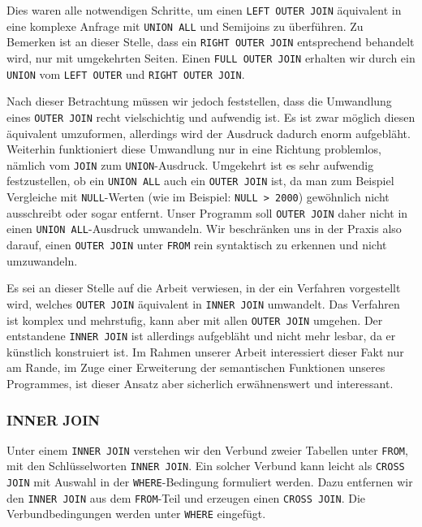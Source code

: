 Dies waren alle notwendigen Schritte, um einen \verb|LEFT OUTER JOIN| äquivalent in eine komplexe Anfrage mit \verb|UNION ALL| und Semijoins zu überführen. Zu Bemerken ist an dieser Stelle, dass ein \verb|RIGHT OUTER JOIN| entsprechend behandelt wird, nur mit umgekehrten Seiten. Einen \verb|FULL OUTER JOIN| erhalten wir durch ein \verb|UNION| vom \verb|LEFT OUTER| und \verb|RIGHT OUTER JOIN|. 

Nach dieser Betrachtung müssen wir jedoch feststellen, dass die Umwandlung eines \verb|OUTER JOIN| recht vielschichtig und aufwendig ist. Es ist zwar möglich diesen äquivalent umzuformen, allerdings wird der Ausdruck dadurch enorm aufgebläht. Weiterhin funktioniert diese Umwandlung nur in eine Richtung problemlos, nämlich vom \verb|JOIN| zum \verb|UNION|-Ausdruck. Umgekehrt ist es sehr aufwendig festzustellen, ob ein \verb|UNION ALL| auch ein \verb|OUTER JOIN| ist, da man zum Beispiel Vergleiche mit \verb|NULL|-Werten (wie im Beispiel: \verb|NULL > 2000|) gewöhnlich nicht ausschreibt oder sogar entfernt. Unser Programm soll \verb|OUTER JOIN| daher nicht in einen \verb|UNION ALL|-Ausdruck umwandeln. Wir beschränken uns in der Praxis also darauf, einen \verb|OUTER JOIN| unter \verb|FROM| rein syntaktisch zu erkennen und nicht umzuwandeln. 

Es sei an dieser Stelle auf die Arbeit \cite{outer2inner} verwiesen, in der ein Verfahren vorgestellt wird, welches \verb|OUTER JOIN| äquivalent in \verb|INNER JOIN| umwandelt. Das Verfahren ist komplex und mehrstufig, kann aber mit allen \verb|OUTER JOIN| umgehen. Der entstandene \verb|INNER JOIN| ist allerdings aufgebläht und nicht mehr lesbar, da er künstlich konstruiert ist. Im Rahmen unserer Arbeit interessiert dieser Fakt nur am Rande, im Zuge einer Erweiterung der semantischen Funktionen unseres Programmes, ist dieser Ansatz aber sicherlich erwähnenswert und interessant.

\subsubsection*{INNER JOIN}

Unter einem \verb|INNER JOIN| verstehen wir den Verbund zweier Tabellen unter \verb|FROM|, mit den Schlüsselworten \verb|INNER JOIN|. Ein solcher Verbund kann leicht als \verb|CROSS JOIN| mit Auswahl in der \verb|WHERE|-Bedingung formuliert werden. Dazu entfernen wir den \verb|INNER JOIN| aus dem \verb|FROM|-Teil und erzeugen einen \verb|CROSS JOIN|. Die Verbundbedingungen werden unter \verb|WHERE| eingefügt.

